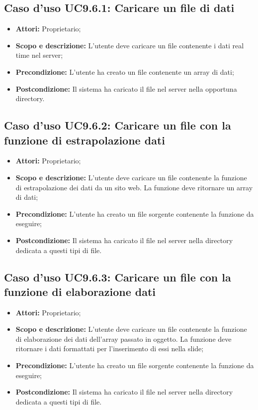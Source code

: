 	\subsection{Caso d'uso UC9.6.1: Caricare un file di dati}
	\begin{itemize}
		\item \textbf{Attori:} Proprietario;
		\item \textbf{Scopo e descrizione:} L'utente deve caricare un file contenente i dati real time nel server;
		\item \textbf{Precondizione:} L'utente ha creato un file contenente un array di dati;
		\item \textbf{Postcondizione:} Il sistema ha caricato il file nel server nella opportuna directory.
	\end{itemize}

	\subsection{Caso d'uso UC9.6.2: Caricare un file con la funzione di estrapolazione dati}
	\begin{itemize}
		\item \textbf{Attori:} Proprietario;
		\item \textbf{Scopo e descrizione:} L'utente deve caricare un file contenente la funzione di estrapolazione dei dati da un sito web. La funzione deve ritornare un array di dati;
		\item \textbf{Precondizione:} L'utente ha creato un file sorgente contenente la funzione da eseguire;
		\item \textbf{Postcondizione:} Il sistema ha caricato il file nel server nella directory dedicata a questi tipi di file.
	\end{itemize}
	
	\subsection{Caso d'uso UC9.6.3: Caricare un file con la funzione di elaborazione dati}
	\begin{itemize}
		\item \textbf{Attori:} Proprietario;
		\item \textbf{Scopo e descrizione:} L'utente deve caricare un file contenente la funzione di elaborazione dei dati dell'array passato in oggetto. La funzione deve ritornare i dati formattati per l'inserimento di essi nella slide;
		\item \textbf{Precondizione:} L'utente ha creato un file sorgente contenente la funzione da eseguire;
		\item \textbf{Postcondizione:} Il sistema ha caricato il file nel server nella directory dedicata a questi tipi di file.
	\end{itemize}
	
